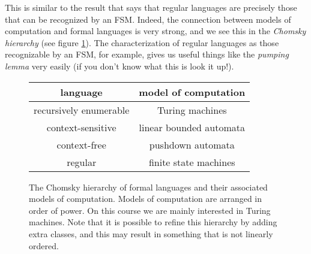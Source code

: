 \documentclass{article}
\theoremstyle{plain}
\begin{document}
This is similar to the result that says that regular languages are precisely those that can be recognized by an FSM. Indeed, the connection between models of computation and formal languages is very strong, and we see this in the \emph{Chomsky hierarchy} (see figure \ref{F:chom}). The characterization of regular languages as those recognizable by an FSM, for example, gives us useful things like the \emph{pumping lemma} very easily (if you don't know what this is look it up!).

\begin{figure}[h]
\begin{center}
\begin{tabular}{ |c| c | }
 \hline \textbf{language} & \textbf{model of computation} \\ \hline
 recursively enumerable & Turing machines \\ \hline 
 context-sensitive & linear bounded automata \\ \hline
 context-free & pushdown automata \\ \hline
 regular & finite state machines\\ \hline
\end{tabular}
\end{center}
\caption{The Chomsky hierarchy of formal languages and their associated models of computation. Models of computation are arranged in order of power. On this course we are mainly interested in Turing machines. Note that it is possible to refine this hierarchy by adding extra classes, and this may result in something that is not linearly ordered.}
\label{F:chom}
\end{figure}
\end{document}
